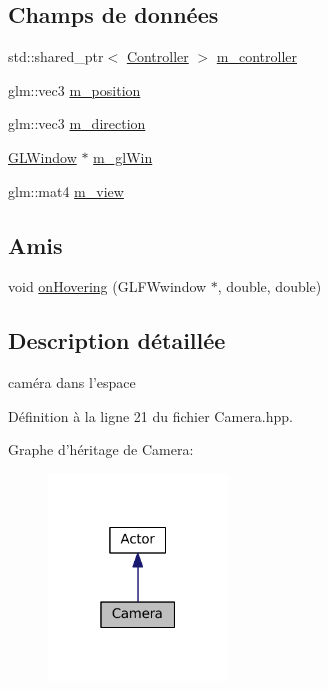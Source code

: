 \subsection*{Champs de données}
\begin{DoxyCompactItemize}
\item 
std\+::shared\+\_\+ptr$<$ \hyperlink{classController}{Controller} $>$ \hyperlink{classCamera_a879e38247f44c717796f38a501d335e3}{m\+\_\+controller}
\item 
glm\+::vec3 \hyperlink{classCamera_a2674b50120e3bafbab54b53e4313d54d}{m\+\_\+position}
\item 
glm\+::vec3 \hyperlink{classCamera_a64d1bf3cfff83eeb294a6cf53a0d4255}{m\+\_\+direction}
\item 
\hyperlink{classGLWindow}{G\+L\+Window} $\ast$ \hyperlink{classCamera_a97abe5fea87690fbb00d920ecf5fcce8}{m\+\_\+gl\+Win}
\item 
glm\+::mat4 \hyperlink{classCamera_ad86d990f179df0cd5560bca660d5ffbf}{m\+\_\+view}
\end{DoxyCompactItemize}
\subsection*{Amis}
\begin{DoxyCompactItemize}
\item 
void \hyperlink{classCamera_ae67f6cdba1f3601ad8cf82996105fe76}{on\+Hovering} (G\+L\+F\+Wwindow $\ast$, double, double)
\end{DoxyCompactItemize}


\subsection{Description détaillée}
caméra dans l'espace 

Définition à la ligne 21 du fichier Camera.\+hpp.



Graphe d'héritage de Camera\+:
\nopagebreak
\begin{figure}[H]
\begin{center}
\leavevmode
\includegraphics[width=135pt]{classCamera__inherit__graph}
\end{center}
\end{figure}


